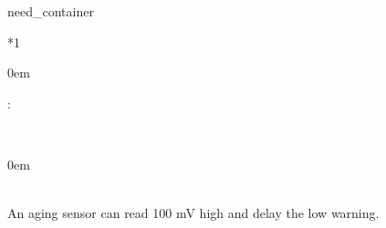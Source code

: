 \documentclass[a4paper,10pt,english]{sphinxmanual}
\begin{document}
\begin{sphinxuseclass}{need_container}

\begin{savenotes}\sphinxattablestart
\sphinxthistablewithglobalstyle
\centering
{}\label{\detokenize{requirements/risks:RISK_SENSOR_DRIFT}}\nobreak
\begin{tabular}[t]{*{1}{}}
\sphinxtoprule
\sphinxtableatstartofbodyhook
\begin{DUlineblock}{0em}
\item[] :  
\end{DUlineblock}
\\
\sphinxhline
\begin{DUlineblock}{0em}
\item[] 
\item[] 
\item[] 
\item[] 
\item[] 
\item[] 
\item[] 
\end{DUlineblock}
\\
\sphinxhline
\sphinxAtStartPar
An aging sensor can read 100 mV high and delay the low warning.
\\
\sphinxbottomrule
\end{tabular}
\sphinxtableafterendhook\par
\sphinxattableend\end{savenotes}

\end{sphinxuseclass}
\end{document}
